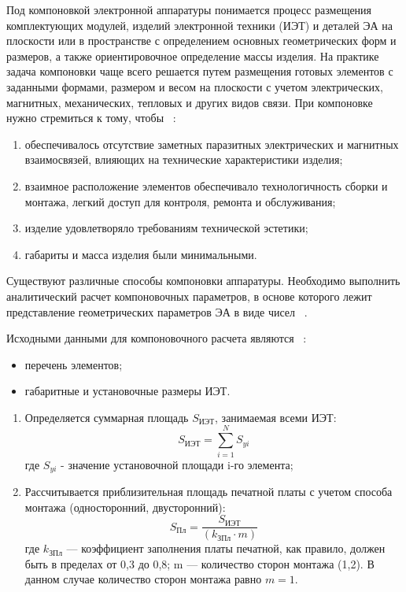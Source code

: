 
Под компоновкой электронной аппаратуры понимается процесс размещения
комплектующих модулей, изделий электронной техники (ИЭТ) и деталей ЭА
на плоскости или в пространстве с определением основных геометрических
форм и размеров, а также ориентировочное определение массы изделия.
На практике задача компоновки чаще всего решается путем размещения
готовых элементов с заданными формами, размером и весом на плоскости с
учетом электрических, магнитных, механических, тепловых и других видов
связи. При компоновке нужно стремиться к тому, чтобы
~\cite{Kostukevich2012}:

\begin{enumerate}
\item обеспечивалось отсутствие заметных паразитных электрических и магнитных взаимосвязей,
  влияющих на технические характеристики изделия;
\item взаимное расположение элементов обеспечивало технологичность сборки и монтажа,
  легкий доступ для контроля, ремонта и обслуживания;  
\item изделие удовлетворяло требованиям технической эстетики;
\item габариты и масса изделия были минимальными.
\end{enumerate}

Существуют различные способы компоновки аппаратуры.  Необходимо
выполнить аналитический расчет компоновочных параметров, в основе
которого лежит представление геометрических параметров ЭА в виде чисел
~\cite{Kostukevich2012}.

Исходными данными для компоновочного расчета являются
~\cite{Kostukevich2012}:
\begin{itemize}
\item перечень элементов;  
\item габаритные и установочные размеры ИЭТ.
\end{itemize}

\begin{enumerate}
\item Определяется суммарная площадь $S_{\text{ИЭТ}}$, занимаемая всеми ИЭТ:
  \begin{equation}
    S_{ИЭТ} = \sum^N_{i=1}S_{yi}
  \end{equation}
  где $S_{yi}$ - значение установочной площади i-го элемента;
\item Рассчитывается приблизительная площадь печатной платы с учетом
  способа монтажа (односторонний, двусторонний):
  \begin{equation}
    S_{Пл} = \frac{S_{ИЭТ}}{(k_{ЗПл} \cdot m)}
  \end{equation}
  где $k_{ЗПл}$ — коэффициент заполнения платы печатной, как правило,
  должен быть в пределах от 0,3 до 0,8;
  m — количество сторон монтажа (1,2).
  В данном случае количество сторон монтажа равно $m=1$.
\end{enumerate}

